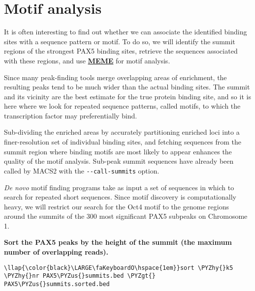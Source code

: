 \documentclass[11pt]{article}
\def\PYZus{\char`\_}
\def\PYZgt{\char`\>}
\def\PYZhy{\char`\-}
\begin{document}
\newpage





    \hypertarget{motif-analysis}{%
\section{Motif analysis}\label{motif-analysis}}

    It is often interesting to find out whether we can associate the
identified binding sites with a sequence pattern or motif. To do so, we
will identify the summit regions of the strongest PAX5 binding sites,
retrieve the sequences associated with these regions, and use
\textbf{\href{http://meme-suite.org/tools/meme}{MEME}} for motif
analysis.

Since many peak-finding tools merge overlapping areas of enrichment, the
resulting peaks tend to be much wider than the actual binding sites. The
summit and its vicinity are the best estimate for the true protein
binding site, and so it is here where we look for repeated sequence
patterns, called motifs, to which the transcription factor may
preferentially bind.

Sub-dividing the enriched areas by accurately partitioning enriched loci
into a finer-resolution set of individual binding sites, and fetching
sequences from the summit region where binding motifs are most likely to
appear enhances the quality of the motif analysis. Sub-peak summit
sequences have already been called by MACS2 with the
\texttt{-\/-call-summits} option.

\textit{De novo} motif finding programs take as input a set of sequences
in which to search for repeated short sequences. Since motif discovery
is computationally heavy, we will restrict our search for the Oct4 motif
to the genome regions around the summits of the 300 most significant
PAX5 subpeaks on Chromosome 1.

    \textbf{Sort the PAX5 peaks by the height of the summit (the maximum
number of overlapping reads).}





\begin{terminalinput}
\begin{Verbatim}[commandchars=\\\{\}]
\llap{\color{black}\LARGE\faKeyboardO\hspace{1em}}sort \PYZhy{}k5 \PYZhy{}nr PAX5\PYZus{}summits.bed \PYZgt{} PAX5\PYZus{}summits.sorted.bed
\end{Verbatim}
\end{terminalinput}
\end{document}
